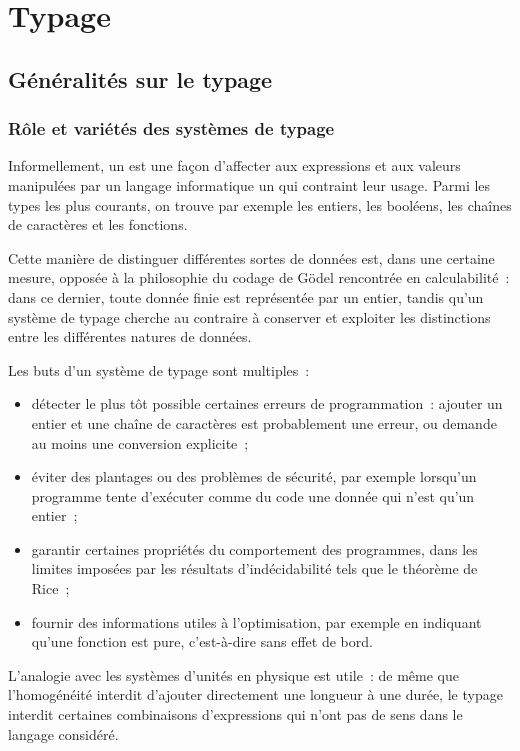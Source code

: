 \chapter{Typage}\label{chapter-typing}

\section{Généralités sur le typage}


\subsection{Rôle et variétés des systèmes de typage}

\thingy Informellement, un  est une façon
d'affecter aux expressions et aux valeurs manipulées par un langage
informatique un  qui contraint leur usage.  Parmi les types
les plus courants, on trouve par exemple les entiers, les booléens, les
chaînes de caractères et les fonctions.

Cette manière de distinguer différentes sortes de données est, dans
une certaine mesure, opposée à la philosophie du codage de Gödel
rencontrée en calculabilité : dans ce dernier, toute donnée finie est
représentée par un entier, tandis qu'un système de typage cherche au
contraire à conserver et exploiter les distinctions entre les
différentes natures de données.

Les buts d'un système de typage sont multiples :
\begin{itemize}
\item détecter le plus tôt possible certaines erreurs de
  programmation : ajouter un entier et une chaîne de caractères est
  probablement une erreur, ou demande au moins une conversion
  explicite ;
\item éviter des plantages ou des problèmes de sécurité, par exemple
  lorsqu'un programme tente d'exécuter comme du code une donnée qui
  n'est qu'un entier ;
\item garantir certaines propriétés du comportement des programmes,
  dans les limites imposées par les résultats d'indécidabilité tels
  que le théorème de Rice ;
\item fournir des informations utiles à l'optimisation, par exemple en
  indiquant qu'une fonction est pure, c'est-à-dire sans effet de bord.
\end{itemize}
L'analogie avec les systèmes d'unités en physique est utile : de même
que l'homogénéité interdit d'ajouter directement une longueur à une
durée, le typage interdit certaines combinaisons d'expressions qui
n'ont pas de sens dans le langage considéré.

